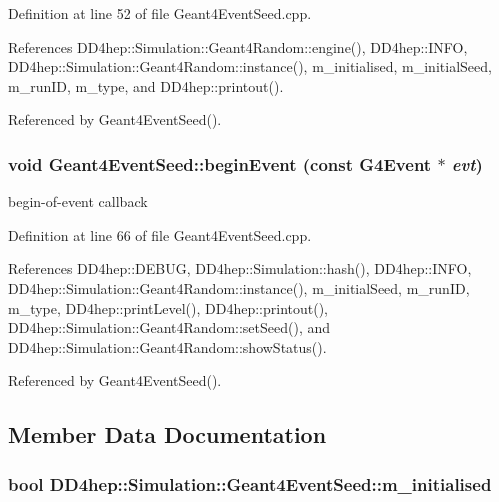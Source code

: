 Definition at line 52 of file Geant4EventSeed.cpp.

References DD4hep::Simulation::Geant4Random::engine(), DD4hep::INFO, DD4hep::Simulation::Geant4Random::instance(), m\_\-initialised, m\_\-initialSeed, m\_\-runID, m\_\-type, and DD4hep::printout().

Referenced by Geant4EventSeed().\hypertarget{class_d_d4hep_1_1_simulation_1_1_geant4_event_seed_a3443a6ff92629d27474a97c1084d2867}{
\subsubsection[{beginEvent}]{\setlength{\rightskip}{0pt plus 5cm}void Geant4EventSeed::beginEvent (const G4Event $\ast$ {\em evt})}}
\label{class_d_d4hep_1_1_simulation_1_1_geant4_event_seed_a3443a6ff92629d27474a97c1084d2867}


begin-\/of-\/event callback 

Definition at line 66 of file Geant4EventSeed.cpp.

References DD4hep::DEBUG, DD4hep::Simulation::hash(), DD4hep::INFO, DD4hep::Simulation::Geant4Random::instance(), m\_\-initialSeed, m\_\-runID, m\_\-type, DD4hep::printLevel(), DD4hep::printout(), DD4hep::Simulation::Geant4Random::setSeed(), and DD4hep::Simulation::Geant4Random::showStatus().

Referenced by Geant4EventSeed().

\subsection{Member Data Documentation}
\hypertarget{class_d_d4hep_1_1_simulation_1_1_geant4_event_seed_a8fa0790e30cdbac4a172af5ff0fd7cc7}{
\subsubsection[{m\_\-initialised}]{\setlength{\rightskip}{0pt plus 5cm}bool {\bf DD4hep::Simulation::Geant4EventSeed::m\_\-initialised}}}
\label{class_d_d4hep_1_1_simulation_1_1_geant4_event_seed_a8fa0790e30cdbac4a172af5ff0fd7cc7}


